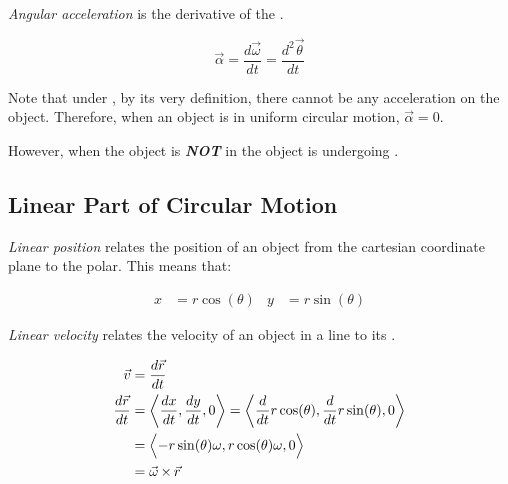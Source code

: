 \begin{definition}\label{def:Angular Acceleration}
  \emph{Angular acceleration} is the derivative of the .

  \begin{equation}\label{eq:Angular Acceleration}
    \vec{\alpha} = \frac{d \vec{\omega}}{dt} = \frac{d^{2} \vec{\theta}}{dt}
  \end{equation}

  \begin{remark}
    Note that under , by its very definition, there cannot be any acceleration on the object.
    Therefore, when an object is in uniform circular motion, $\vec{\alpha} = 0$.

    However, when the object is \textbf{\emph{NOT}} in  the object is undergoing .
  \end{remark}
\end{definition}

\subsection{Linear Part of Circular Motion}\label{subsec:Linear Circular Motion}
\begin{definition}\label{def:Linear Position}
  \emph{Linear position} relates the position of an object from the cartesian coordinate plane to the polar.
  This means that:

  \begin{equation}\label{eq:Linear Position}
    \begin{aligned}
      x &= r \cos ( \theta ) & y &= r \sin ( \theta )
    \end{aligned}
  \end{equation}
\end{definition}

\begin{definition}\label{def:Linear Velocity}
  \emph{Linear velocity} relates the velocity of an object in a line to its .

  \begin{equation}\label{eq:Linear Velocity}
    \begin{aligned}
      \vec{v} &= \frac{d \vec{r}}{dt} \\
      \frac{d \vec{r}}{dt} &= \biggl \langle \frac{dx}{dt}, \frac{dy}{dt}, 0 \biggr \rangle = \biggl \langle \frac{d}{dt} r \cos ( \theta ), \frac{d}{dt} r \sin ( \theta ), 0 \biggr \rangle \\
      &= \Bigl \langle -r \sin ( \theta ) \omega, r \cos ( \theta ) \omega, 0 \Bigr \rangle \\
      &= \vec{\omega} \operatorname{\times} \vec{r}
    \end{aligned}
  \end{equation}
\end{definition}

